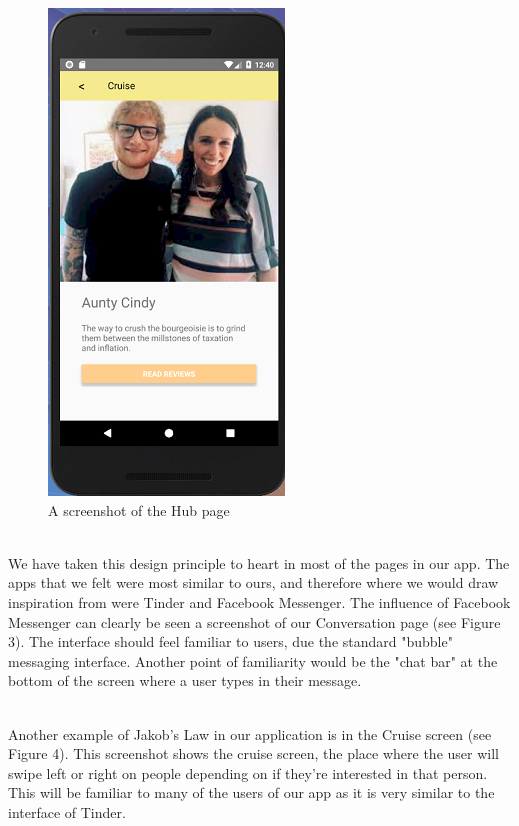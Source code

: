 \documentclass[a4paper, 11pt]{article}
\begin{document}
\begin{figure}
\begin{minipage}{.55\textwidth}
  \includegraphics[width=.7\linewidth]{cindy.png}
  \caption{A screenshot of the Hub page}
  \label{fig:test2}
\end{minipage}
\end{figure}

~\\
We have taken this design principle to heart in most of the pages in our app. The apps that we felt were most similar to ours, and therefore where we would draw inspiration from were Tinder and Facebook Messenger. The influence of Facebook Messenger can clearly be seen a screenshot of our Conversation page (see Figure 3). The interface should feel familiar to users, due the standard "bubble" messaging interface. Another point of familiarity would be the "chat bar" at the bottom of the screen where a user types in their message.

~\\
Another example of Jakob's Law in our application is in the Cruise screen (see Figure 4). This screenshot shows the cruise screen, the place where the user will swipe left or right on people depending on if they're interested in that person. This will be familiar to many of the users of our app as it is very similar to the interface of Tinder.
\end{document}
